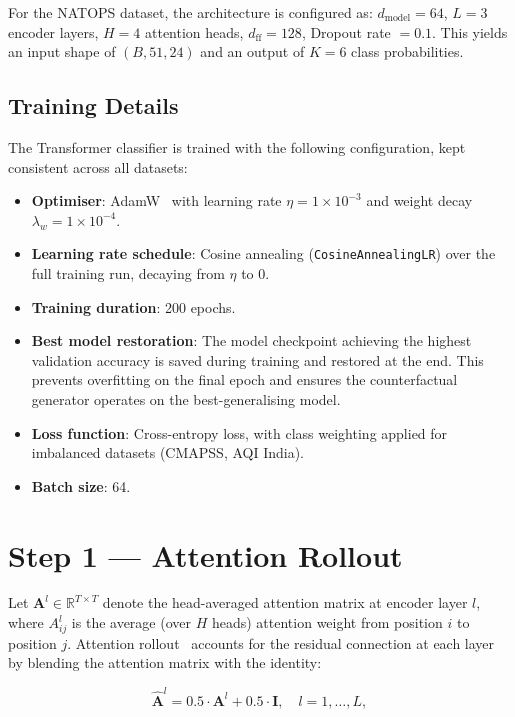 For the NATOPS dataset, the architecture is configured as: $d_{\text{model}} = 64$, $L = 3$ encoder layers, $H = 4$ attention heads, $d_{\text{ff}} = 128$, Dropout rate $= 0.1$. This yields an input shape of $(B, 51, 24)$ and an output of $K = 6$ class probabilities.

\subsection{Training Details}

The Transformer classifier is trained with the following configuration, kept consistent across all datasets:

\begin{itemize}
    \item \textbf{Optimiser}: AdamW~\cite{loshchilov2019decoupled} with learning rate $\eta = 1 \times 10^{-3}$ and weight decay $\lambda_w = 1 \times 10^{-4}$.
    \item \textbf{Learning rate schedule}: Cosine annealing (\texttt{CosineAnnealingLR}) over the full training run, decaying from $\eta$ to $0$.
    \item \textbf{Training duration}: 200 epochs.
    \item \textbf{Best model restoration}: The model checkpoint achieving the highest validation accuracy is saved during training and restored at the end. This prevents overfitting on the final epoch and ensures the counterfactual generator operates on the best-generalising model.
    \item \textbf{Loss function}: Cross-entropy loss, with class weighting applied for imbalanced datasets (CMAPSS, AQI India).
    \item \textbf{Batch size}: 64.
\end{itemize}

\section{Step 1 — Attention Rollout}

Let $\mathbf{A}^l \in \mathbb{R}^{T \times T}$ denote the head-averaged attention matrix at encoder layer $l$, where $A^l_{ij}$ is the average (over $H$ heads) attention weight from position $i$ to position $j$. Attention rollout~\cite{abnar2020quantifying} accounts for the residual connection at each layer by blending the attention matrix with the identity:

\begin{equation}
    \hat{\mathbf{A}}^l = 0.5 \cdot \mathbf{A}^l + 0.5 \cdot \mathbf{I}, \quad l = 1, \ldots, L,
\end{equation}

